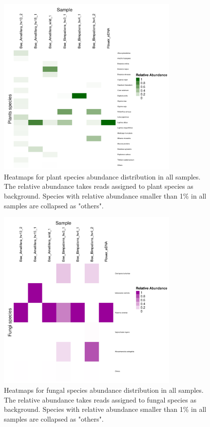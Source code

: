 \documentclass[11pt]{article}
\begin{document}
  \begin{figure}[H]
    \centering
    \includegraphics[width=0.8\textwidth]{../Figures/RelativeAbundance_0_01_species_Plants.pdf}
    \caption{Heatmaps for plant species abundance distribution in all samples. 
    The relative abundance takes reads assigned to plant species as background. 
    Species with relative abundance smaller than 1\% in all samples are collapsed as "others".}
    \label{PlantHeatmap}
    \end{figure}

  \begin{figure}[H]
    \centering
    \includegraphics[width=0.8\textwidth]{../Figures/RelativeAbundance_0_01_species_Fungi.pdf}
    \caption{Heatmaps for fungal species abundance distribution in all samples. 
    The relative abundance takes reads assigned to fungal species as background. 
    Species with relative abundance smaller than 1\% in all samples are collapsed as "others".}
    \label{FungusHeatmap}
    \end{figure}
\end{document}

